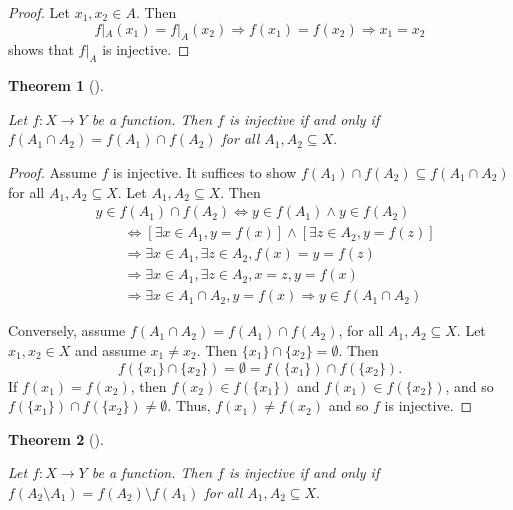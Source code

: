\documentclass[
  letterpaper,
  10pt,
  reqno,
  twopage,
  openany]{book}
\theoremstyle{plain}
\theoremstyle{definition}
\theoremstyle{definition}
\theoremstyle{definition}
\theoremstyle{plain}
\theoremstyle{plain}
\newtheorem{theorem}{Theorem}[chapter]
\theoremstyle{remark}
\begin{document}
\begin{proof}

Let \(x_1, x_2\in A\). Then \[
f|_A(x_1)=f|_A(x_2) 
\Longrightarrow f(x_1)=f(x_2)
\Longrightarrow x_1=x_2
\] shows that \(f|_A\) is injective.

\end{proof}

\leavevmode{}%
\begin{theorem}[]\label{thm-injective-if-and-only-if}

Let \(f:X\to Y\) be a function. Then \(f\) is injective if and only if
\(f(A_1\cap A_2) = f(A_1)\cap f(A_2)\) for all \(A_1, A_2\subseteq X.\)

\end{theorem}

\begin{proof}

Assume \(f\) is injective. It suffices to show
\(f(A_1)\cap f(A_2)\subseteq f(A_1\cap A_2)\) for all
\(A_1, A_2\subseteq X\). Let \(A_1, A_2\subseteq X\). Then
\begin{align*}
& y\in f(A_1)\cap f(A_2) \Leftrightarrow y\in f(A_1)\land y\in f(A_2) \\
& \qquad \Leftrightarrow [\exists x\in A_1, y=f(x)] \land [\exists z\in A_2, y=f(z)] \\
& \qquad \Longrightarrow \exists x\in A_1, \exists z\in A_2, f(x)=y=f(z) \\
& \qquad \Longrightarrow \exists x\in A_1, \exists z\in A_2, x=z, y=f(x)  \\
& \qquad \Longrightarrow \exists x\in A_1\cap A_2, y=f(x) \Longrightarrow  y\in f(A_1\cap A_2) 
\end{align*}

Conversely, assume \(f(A_1\cap A_2)=f(A_1)\cap f(A_2)\), for all
\(A_1, A_2\subseteq X\). Let \(x_1, x_2\in X\) and assume
\(x_1\neq x_2\). Then \(\{x_1\}\cap \{x_2\}=\emptyset\). Then \[
f(\{x_1\}\cap \{x_2\})=\emptyset=f(\{x_1\})\cap f(\{x_2\}).
\] If \(f(x_1)=f(x_2)\), then \(f(x_2)\in f(\{x_1\})\) and
\(f(x_1)\in f(\{x_2\})\), and so
\(f(\{x_1\})\cap f(\{x_2\}) \neq \emptyset.\) Thus,
\(f(x_1)\neq f(x_2)\) and so \(f\) is injective.

\end{proof}

\leavevmode{}%
\begin{theorem}[]\label{thm-setminus-injective}

Let \(f:X\to Y\) be a function. Then \(f\) is injective if and only if
\(f(A_2\setminus A_1)=f(A_2)\setminus f(A_1)\) for all
\(A_1, A_2\subseteq X.\)

\end{theorem}
\end{document}

